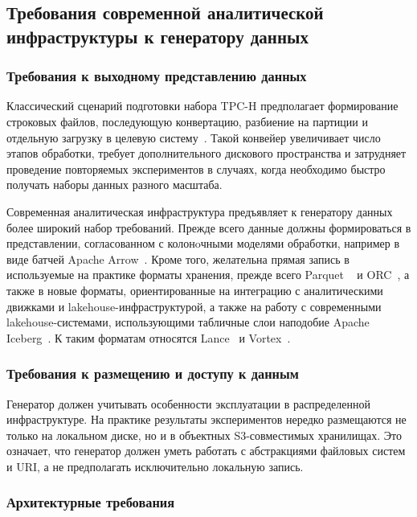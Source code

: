 \subsection{Требования современной аналитической инфраструктуры к генератору данных}

\subsubsection{Требования к выходному представлению данных}

Классический сценарий подготовки набора TPC-H предполагает формирование
строковых файлов, последующую конвертацию, разбиение на партиции и отдельную
загрузку в целевую систему~\cite{dbgen-mirror}. Такой конвейер увеличивает
число этапов обработки, требует дополнительного дискового пространства и
затрудняет проведение повторяемых экспериментов в случаях, когда необходимо
быстро получать наборы данных разного масштаба.

Современная аналитическая инфраструктура предъявляет к генератору данных более
широкий набор требований. Прежде всего данные должны формироваться в
представлении, согласованном с колонoчными моделями обработки, например в виде
батчей Apache Arrow~\cite{apache-arrow}. Кроме того, желательна прямая запись в
используемые на практике форматы хранения, прежде всего Parquet
~\cite{apache-parquet} и ORC~\cite{apache-orc}, а также в новые
форматы, ориентированные на интеграцию с аналитическими движками и
lakehouse-инфраструктурой, а также на работу с современными lakehouse-системами,
использующими табличные слои наподобие Apache Iceberg~\cite{apache-iceberg}.
К таким форматам относятся Lance~\cite{lance-format} и
Vortex~\cite{vortex-format}.

\subsubsection{Требования к размещению и доступу к данным}

Генератор должен учитывать особенности эксплуатации в распределенной
инфраструктуре. На практике результаты экспериментов нередко размещаются не
только на локальном диске, но и в объектных S3-совместимых
хранилищах. Это означает, что генератор должен уметь работать с абстракциями
файловых систем и URI, а не предполагать исключительно локальную
запись.

\subsubsection{Архитектурные требования}

